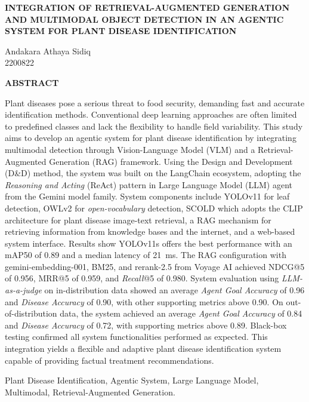 \documentclass[12pt, a4paper, oneside]{report}
\newcommand{\wordonespacing}{0.955212}
\newcommand{\wordonehalfspacing}{1.432818}
\newenvironment{abstract-en}{
    \clearpage
    \setstretch{\wordonespacing}
    \fontsize{11pt}{13pt}\selectfont
    \itshape
}{
    \par
}
\newcommand{\thesistitleen}{INTEGRATION OF RETRIEVAL-AUGMENTED GENERATION AND MULTIMODAL OBJECT DETECTION IN AN AGENTIC SYSTEM FOR PLANT DISEASE IDENTIFICATION}
\newcommand{\authorname}{Andakara Athaya Sidiq}
\newcommand{\studentid}{2200822}
\begin{document}
\begin{abstract-en}
    \begin{center}
        \upshape
        {\bfseries \setstretch{\wordonehalfspacing} \MakeUppercase{\thesistitleen} \par}
        \vspace{\baselineskip}
        {\setstretch{\wordonehalfspacing} \authorname \\
        \studentid \par}
        \vspace{\baselineskip}
        {\bfseries ABSTRACT}
    \end{center}
    \vspace{-0.5em}
    Plant diseases pose a serious threat to food security, demanding fast and accurate identification methods. Conventional deep learning approaches are often limited to predefined classes and lack the flexibility to handle field variability. This study aims to develop an agentic system for plant disease identification by integrating multimodal detection through Vision-Language Model (VLM) and a Retrieval-Augmented Generation (RAG) framework. Using the Design and Development (D\&D) method, the system was built on the LangChain ecosystem, adopting the \textit{Reasoning and Acting} (ReAct) pattern in Large Language Model (LLM) agent from the Gemini model family. System components include YOLOv11 for leaf detection, OWLv2 for \textit{open-vocabulary} detection, SCOLD which adopts the CLIP architecture for plant disease image-text retrieval, a RAG mechanism for retrieving information from knowledge bases and the internet, and a web-based system interface. Results show YOLOv11s offers the best performance with an mAP50 of 0.89 and a median latency of \qty{21}{ms}. The RAG configuration with gemini-embedding-001, BM25, and rerank-2.5 from Voyage AI achieved NDCG@5 of 0.956, MRR@5 of 0.959, and \textit{Recall}@5 of 0.980. System evaluation using \textit{LLM-as-a-judge} on in-distribution data showed an average \textit{Agent Goal Accuracy} of 0.96 and \textit{Disease Accuracy} of 0.90, with other supporting metrics above 0.90. On out-of-distribution data, the system achieved an average \textit{Agent Goal Accuracy} of 0.84 and \textit{Disease Accuracy} of 0.72, with supporting metrics above 0.89. Black-box testing confirmed all system functionalities performed as expected. This integration yields a flexible and adaptive plant disease identification system capable of providing factual treatment recommendations.

    \vspace{1em}
     Plant Disease Identification, Agentic System, Large Language Model, Multimodal, Retrieval-Augmented Generation.
\end{abstract-en}
\end{document}
